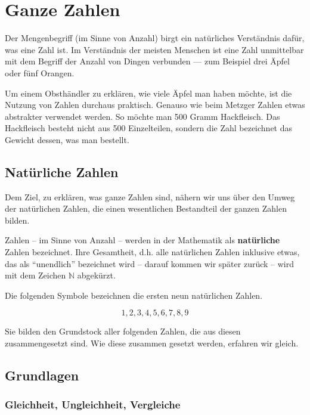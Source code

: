 
\chapter{Ganze Zahlen}

Der Mengenbegriff (im Sinne von Anzahl) birgt ein natürliches Verständnis dafür, was eine Zahl ist. Im Verständnis der meisten Menschen ist eine Zahl unmittelbar mit dem Begriff der Anzahl von Dingen verbunden --- zum Beispiel drei Äpfel oder fünf Orangen.

Um einem Obsthändler zu erklären, wie viele Äpfel man haben möchte, ist die Nutzung von Zahlen durchaus praktisch. Genauso wie beim Metzger Zahlen etwas abstrakter verwendet werden. So möchte man 500 Gramm Hackfleisch. Das Hackfleisch besteht nicht aus 500 Einzelteilen, sondern die Zahl bezeichnet das Gewicht dessen, was man bestellt.

\section{Natürliche Zahlen}

Dem Ziel, zu erklären, was ganze Zahlen sind, nähern wir uns über den Umweg der natürlichen Zahlen, die einen wesentlichen Bestandteil der ganzen Zahlen bilden. 


\begin{definition}
Zahlen -- im Sinne von Anzahl -- werden in der Mathematik als \textbf{natürliche} Zahlen bezeichnet. Ihre Gesamtheit, d.h. alle natürlichen Zahlen inklusive etwas, das als "`unendlich"' bezeichnet wird -- darauf kommen wir später zurück -- wird mit dem Zeichen $\mathbb{N}$ abgekürzt.
\end{definition}

Die folgenden Symbole bezeichnen die ersten neun natürlichen Zahlen. 

\[ 
1, 2, 3, 4, 5, 6, 7, 8, 9
\]

Sie bilden den Grundstock aller folgenden Zahlen, die aus diesen zusammengesetzt sind. Wie diese zusammen gesetzt werden, erfahren wir gleich.

\section{Grundlagen}

\subsection{Gleichheit, Ungleichheit, Vergleiche}

